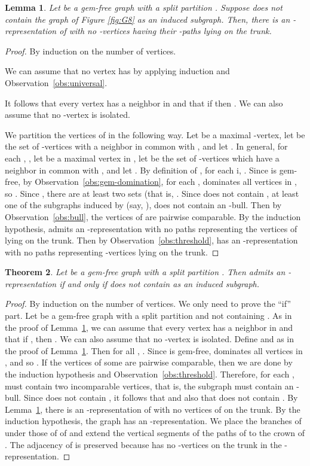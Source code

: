 \documentclass[11pt,3p,times]{elsarticle}
\newenvironment{myproof}{\begin{proof}}{\end{proof}}
\newtheorem{theorem}{Theorem}
\newtheorem{lemma}[theorem]{Lemma}
\begin{document}
\begin{lemma}\label{lem:two-bull}
Let  be a gem-free graph with a split partition .
Suppose  does not contain the graph  of Figure \ref{fig:G8}
as an induced subgraph. Then,
there is an -representation of  with no -vertices
having their -paths lying on the trunk. 
\end{lemma}
\begin{myproof}
By induction on the number of vertices.

We can assume that no vertex  has  by applying induction and
Observation~\ref{obs:universal}.

It follows that every vertex  has a neighbor in  and that
if  then . We can also assume that no
-vertex is isolated.


We partition the vertices of  in the following way.  Let  be a
maximal -vertex, let  be the set of -vertices with a neighbor
in common with , and let . In general, for each , ,
let  be a maximal vertex in ,
let  be the set of -vertices which have a neighbor in common with ,
and let . By definition of , for each i,
. Since  is gem-free, by Observation~\ref{obs:gem-domination},
for each ,  dominates all vertices in , so .
Since , there are at least two sets  (that is, .
Since  does not contain , at least one of the subgraphs induced by
  (say, ), does not contain an -bull. Then by
Observation~\ref{obs:bull}, the vertices of  are pairwise comparable.  By
the induction hypothesis,  admits an -representation
with no paths representing the vertices of  lying on the trunk.  Then
by Observation~\ref{obs:threshold},  has an -representation with no paths
representing -vertices lying on the trunk.
\end{myproof}
\begin{theorem}\label{thm:gem-free}
Let  be a gem-free graph with a split partition . Then
 admits an -representation if and only if  does not contain
 as an induced subgraph.
\end{theorem}
\begin{myproof}
By induction on the number of vertices. We
only need to prove the ``if'' part. Let  be a gem-free graph
with a split partition  and not containing .
As in the proof of Lemma~\ref{lem:two-bull}, we can assume that
every vertex  has a neighbor in  and that if ,
then . We can also assume that no
-vertex is isolated.
Define  and  as in the proof of Lemma~\ref{lem:two-bull}.
Then for all , . Since  is gem-free,
 dominates all vertices in , and so . If
the vertices of some  are pairwise comparable, then we are done
by the induction hypothesis and Observation~\ref{obs:threshold}.
Therefore, for each ,  must contain two incomparable vertices,
that is, the subgraph  must contain an -bull.  Since
 does not contain , it follows that  and also that
 does not contain .   By
Lemma~\ref{lem:two-bull}, there is an -representation of
 with no vertices of  on the trunk. By the induction
hypothesis, the graph  has an
-representation. We place the branches of  under those
of of  and extend the vertical segments of the paths of
 to the crown of . The adjacency of  is preserved
because  has no -vertices on the trunk in the
-representation.
\end{myproof}
\end{document}
